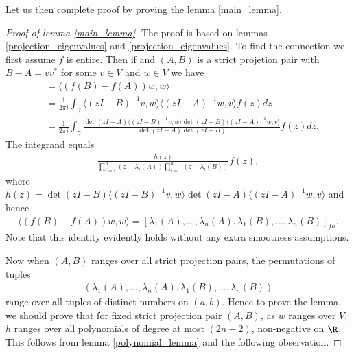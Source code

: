 Let us then complete proof by proving the lemma \ref{main_lemma}.

\begin{proof}[Proof of lemma \ref{main_lemma}]
	The proof is based on lemmas \ref{projection_eigenvalues} and \ref{projection_eigenvalues}. To find the connection we first assume $f$ is entire. Then if and $(A, B)$ is a strict projetion pair with $B - A = v v^{*}$ for some $v \in V$ and $w \in V$ we have
	\begin{align*}
		&= \langle (f(B) - f(A)) w, w \rangle \\
		&= \frac{1}{2 \pi i}\int_{\gamma} \langle (z I - B)^{-1} v, w \rangle  \langle (z I - A)^{-1} w, v \rangle f(z) dz \\
		&= \frac{1}{2 \pi i}\int_{\gamma} \frac{\det(z I - A)\langle (z I - B)^{-1} v, w \rangle \det(z I - B) \langle (z I - A)^{-1} w, v \rangle}{\det(z I - A) \det(z I - B)} f(z) dz.
	\end{align*}
	The integrand equals
	\begin{align*}
		\frac{h(z)}{\prod_{i = 1}^{n}(z - \lambda_{i}(A)) \prod_{i = 1}^{n}(z - \lambda_{i}(B))} f(z),
	\end{align*}
	where $h(z) = \det(z I - B)\langle (z I - B)^{-1} v, w \rangle \det(z I - A) \langle (z I - A)^{-1} w, v \rangle$ and hence
	\begin{align*}
		\langle (f(B) - f(A)) w, w \rangle = [\lambda_{1}(A), \ldots, \lambda_{n}(A), \lambda_{1}(B), \ldots, \lambda_{n}(B)]_{f h}.
	\end{align*}
	Note that this identity evidently holds without any extra smootness assumptions.

	Now when $(A, B)$ ranges over all strict projection pairs, the permutations of tuples
	\begin{align}
	(\lambda_{1}(A), \ldots, \lambda_{n}(A), \lambda_{1}(B), \ldots, \lambda_{n}(B))
	\end{align}
	range over all tuples of distinct numbers on $(a, b)$. Hence to prove the lemma, we should prove that for fixed strict projection pair $(A, B)$, as $w$ ranges over $V$, $h$ ranges over all polynomials of degree at most $(2 n - 2)$, non-negative on $\R$. This follows from lemma \ref{polynomial_lemma} and the following observation.


\end{proof}
